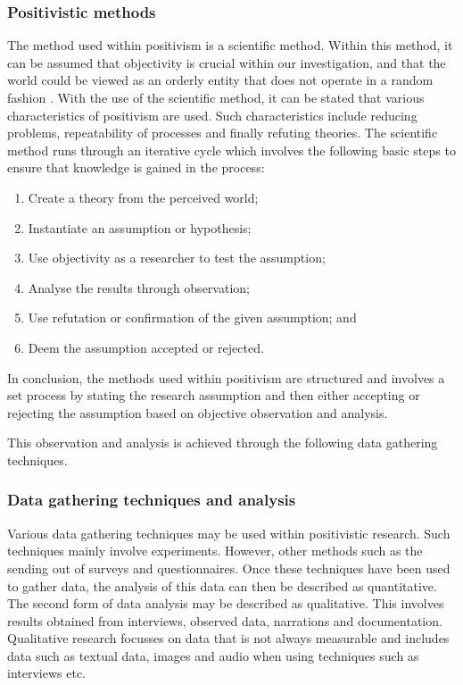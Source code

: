 \subsubsection{Positivistic methods}
The method used within positivism is a scientific method. Within this method, it can be assumed that objectivity is crucial within our investigation, and that the world could be viewed as an orderly entity that does not operate in a random fashion \citep{OatesJ2006}. 
With the use of the scientific method, it can be stated that various characteristics of positivism are used. Such characteristics include reducing problems, repeatability of processes and finally refuting theories. 
The scientific method runs through an iterative cycle which involves the following basic steps to ensure that knowledge is gained in the process:
\begin{enumerate}
	\item Create a theory from the perceived world;
	\item Instantiate an assumption or hypothesis;
	\item Use objectivity as a researcher to test the assumption;
	\item Analyse the results through observation;
	\item Use refutation or confirmation of the given assumption; and
	\item Deem the assumption accepted or rejected.
\end{enumerate}

In conclusion, the methods used within positivism are structured and involves a set process by stating the research assumption and then either accepting or rejecting the assumption based on objective observation and analysis. 

This observation and analysis is achieved through the following data gathering techniques.

\subsubsection{Data gathering techniques and analysis}
Various data gathering techniques may be used within positivistic research. Such techniques mainly involve experiments. However, other methods such as the sending out of surveys and questionnaires. Once these techniques have been used to gather data, the analysis of this data can then be described as quantitative. The second form of data analysis may be described as qualitative. This involves results obtained from interviews, observed data, narrations and documentation. Qualitative research focusses on data that is not always measurable and includes data such as textual data, images and audio when using techniques such as interviews etc. 

